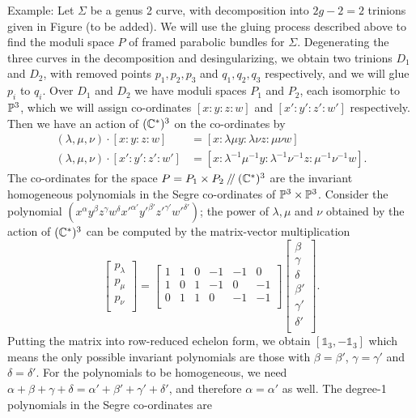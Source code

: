 	Example: Let $\Sigma$ be a genus 2 curve, with decomposition into $2g-2 = 2$ trinions given in Figure (to be added). We will use the gluing process described above to find the moduli space $P$ of framed parabolic bundles for $\Sigma$. Degenerating the three curves in the decomposition and desingularizing, we obtain two trinions $D_1$ and $D_2$, with removed points ${p_1,p_2,p_3}$ and ${q_1,q_2,q_3}$ respectively, and we will glue $p_i$ to $q_i$. Over $D_1$ and $D_2$ we have moduli spaces $P_1$ and $P_2$, each isomorphic to $\mathbb{P}^3$, which we will assign co-ordinates $[x:y:z:w]$ and $[x':y':z':w']$ respectively. Then we have an action of $(\mathbb{C}^\ast)^3$ on the co-ordinates by
	\begin{align*}
		(\lambda, \mu,\nu)\cdot [x:y:z:w] &= [x:\lambda \mu y: \lambda \nu z: \mu\nu w]\\
		(\lambda, \mu,\nu)\cdot [x':y':z':w'] &= [x:\lambda^{-1} \mu^{-1} y: \lambda^{-1} \nu^{-1} z: \mu^{-1}\nu^{-1} w].
	\end{align*}
	The co-ordinates for the space $P = P_1 \times  P_2 \mathbin{/\mkern-4mu/} (\mathbb{C}^\ast)^3$ are the invariant homogeneous polynomials in the Segre co-ordinates of $\mathbb{P}^3 \times \mathbb{P}^3$. Consider the polynomial $(x^\alpha y^\beta z^\gamma w^\delta x'^{\alpha'} y'^{\beta'} z'^{\gamma'} w'^{\delta'})$; the power of $\lambda,\mu$ and $\nu$ obtained by the action of $(\mathbb{C}^\ast)^3$ can be computed by the matrix-vector multiplication
	\begin{equation}
		\begin{bmatrix}
		p_\lambda \\
		p_\mu \\
		p_\nu \\
		\end{bmatrix} = \begin{bmatrix}
		1 & 1 & 0 & -1 & -1 & 0\\
		1 & 0 & 1 & -1 & 0 & -1\\
		0 & 1 & 1 & 0 & -1 & - 1\\
		\end{bmatrix}\begin{bmatrix}
		\beta \\
		\gamma \\
		\delta \\
		\beta' \\
		\gamma'\\
		\delta '\\
		\end{bmatrix}.
	\end{equation}
	Putting the matrix into row-reduced echelon form, we obtain $[\mathds{1}_{3}, -\mathds{1}_3]$ which means the only possible invariant polynomials are those with $\beta = \beta'$, $\gamma = \gamma'$ and $\delta = \delta'$. For the polynomials to be homogeneous, we need $\alpha+\beta+\gamma+\delta = \alpha'+\beta'+\gamma'+\delta'$, and therefore $\alpha = \alpha'$ as well. The degree-1 polynomials in the Segre co-ordinates are
